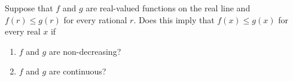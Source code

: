 \documentclass{article}
\begin{document}
\setlength{\parindent}{0pt}
Suppose that $f$ and $g$ are real-valued functions on the real line and $f(r)\le g(r)$ for every rational $r$. Does this imply that $f(x)\le g(x)$ for every real $x$ if
\begin{enumerate}[label=\alph*)]
\item $f$ and $g$ are non-decreasing?
\item $f$ and $g$ are continuous?
\end{enumerate}
\end{document}
